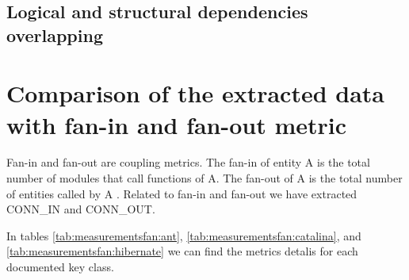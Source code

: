 \documentclass[12pt]{mitthesis}
\begin{document}
\begin{table}[!h]
\renewcommand{\arraystretch}{1}
\caption{Measurements for Hibernate using only logical dependencies}
\label{tab:measurementshistory:hibernate}
\centering
{}
\end{table}

\subsection{Logical and structural dependencies overlapping}
\label{sec:overlapping}




\section{Comparison of the extracted data with fan-in and fan-out metric}
\label{sec:metrics}

Fan-in and fan-out are coupling metrics. The fan-in of entity A is the total number of modules that call functions of A. The fan-out of A is the total number of entities called by A \cite{5507329}.
Related to fan-in and fan-out we have extracted CONN\_IN and CONN\_OUT. 

In tables \ref{tab:measurementsfan:ant}, \ref{tab:measurementsfan:catalina}, and \ref{tab:measurementsfan:hibernate} we can find the metrics detalis for each documented key class.
\end{document}
